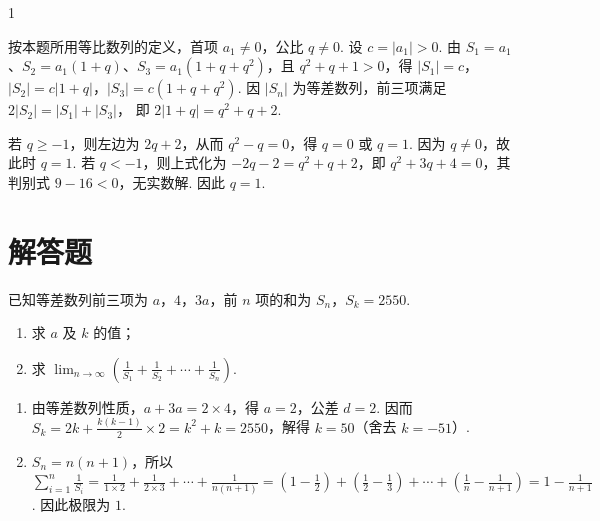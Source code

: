 \begin{answer}
1
\end{answer}

\begin{solution}
按本题所用等比数列的定义，首项 \(a_1\ne0\)，公比 \(q\ne0\). 设 \(c=|a_1|>0\). 由 \(S_1=a_1\)、\(S_2=a_1(1+q)\)、\(S_3=a_1(1+q+q^2)\)，且 \(q^2+q+1>0\)，得
\(|S_1|=c\)，\(|S_2|=c|1+q|\)，\(|S_3|=c(1+q+q^2)\).
因 \(|S_n|\) 为等差数列，前三项满足
\(2|S_2|=|S_1|+|S_3|\)，
即 \(2|1+q|=q^2+q+2\).

若 \(q\geq-1\)，则左边为 \(2q+2\)，从而 \(q^2-q=0\)，得 \(q=0\) 或 \(q=1\). 因为 \(q\ne0\)，故此时 \(q=1\). 若 \(q<-1\)，则上式化为 \(-2q-2=q^2+q+2\)，即 \(q^2+3q+4=0\)，其判别式 \(9-16<0\)，无实数解. 因此 \(q=1\).
\end{solution}

\section{解答题}
\begin{problem}
已知等差数列前三项为 \(a\)，\(4\)，\(3a\)，前 \(n\) 项的和为 \(S_n\)，\(S_k = 2550\).

\begin{enumerate}
\item 求 \(a\) 及 \(k\) 的值；
\item 求 \(\displaystyle\lim_{n\to\infty}\left(\frac{1}{S_1}+\frac{1}{S_2}+\cdots+\frac{1}{S_n}\right)\).
\end{enumerate}
\end{problem}

\begin{solution}
\begin{enumerate}
\item 由等差数列性质，\(a+3a=2\times4\)，得 \(a=2\)，公差 \(d=2\). 因而 \(S_k=2k+\frac{k(k-1)}{2}\times2=k^2+k=2550\)，解得 \(k=50\)（舍去 \(k=-51\)）.

\item \(S_n=n(n+1)\)，所以
\(\displaystyle\sum_{i=1}^{n}\frac1{S_i}=\frac1{1\times2}+\frac1{2\times3}+\cdots+\frac1{n(n+1)}=\left(1-\frac12\right)+\left(\frac12-\frac13\right)+\cdots+\left(\frac1n-\frac1{n+1}\right)=1-\frac1{n+1}\).
因此极限为 \(1\).
\end{enumerate}
\end{solution}


